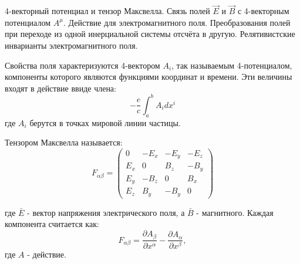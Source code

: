 \documentclass[__main__.tex]{subfiles}
\begin{document}
4-векторный потенциал и тензор Максвелла. Связь полей $\vec{E}$ и $\vec{B}$ с 4-векторным потенциалом $A^\mu$. Действие для электромагнитного поля. Преобразования полей при переходе из одной инерциальной системы отсчёта в другую. Релятивистские инварианты электромагнитного поля.\\ 

\begin{definition}
	Свойства поля характеризуются 4-вектором $A_i$, так называемым 4-потенциалом, компоненты которого являются функциями координат и времени. Эти величины входят в действие ввиде члена:
	$$-\frac{e}{c}\int_{a}^{b}A_idx^i$$
	где $A_i$ берутся в точках мировой линии частицы. 
\end{definition}

\begin{definition}
	Тензором Максвелла называется: 
	$$F_{\alpha\beta}=
	\begin{pmatrix}
	0 & -E_x & -E_y & -E_z\\
	E_x & 0 & B_z & -B_y\\
	E_y & -B_z & 0 & B_x\\
	E_z & B_y & -B_y & 0
	\end{pmatrix}$$
\end{definition}

где $\bar E$ - вектор напряжения электрического поля, а $\bar B$ - магнитного.
Каждая компонента считается как:
$$
F_{\alpha\beta}=\frac{\partial A_\beta}{\partial x^{\alpha}}
-\frac{\partial A_\alpha}{\partial x^{\beta}},
$$
где $A$ - действие.
\end{document}
